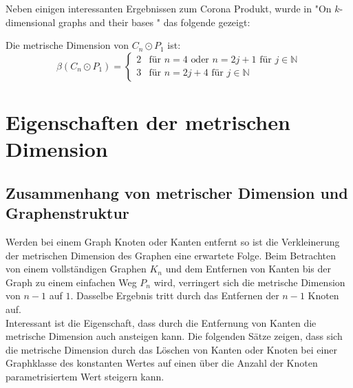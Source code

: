 Neben einigen interessanten Ergebnissen zum Corona Produkt, wurde in  "On $k$-dimensional graphs and their bases
"\cite{bases} das folgende gezeigt:
\begin{lem}Die metrische Dimension von $C_n \odot P_1$ ist:
\begin{equation}
  \beta(C_n \odot P_1)=
   \begin{cases}
     2 & \text{f\"ur } n = 4 \text{ oder } n = 2j+1 \text{ f\"ur } j \in \mathbb{N} \\
     3 & \text{f\"ur } n = 2j+4 \text{ f\"ur } j \in \mathbb{N} 
   \end{cases}
\end{equation}
\end{lem}
\chapter{Eigenschaften der metrischen Dimension}
\label{kapallg}
\section{Zusammenhang von metrischer Dimension und Graphenstruktur}
Werden bei einem Graph Knoten oder Kanten entfernt so ist die Verkleinerung der metrischen Dimension des Graphen eine erwartete Folge. Beim Betrachten von einem vollständigen Graphen $K_n$ und dem Entfernen von Kanten bis der Graph zu einem einfachen Weg $P_n$ wird, verringert sich die metrische Dimension von $n-1$ auf $1$. Dasselbe Ergebnis tritt durch das Entfernen der $n-1$ Knoten auf.\\Interessant ist die Eigenschaft, dass durch die Entfernung von Kanten die metrische Dimension auch ansteigen kann. Die folgenden Sätze zeigen, dass sich die metrische Dimension durch das Löschen von Kanten oder Knoten bei einer Graphklasse des konstanten Wertes auf einen über die Anzahl der Knoten parametrisiertem Wert steigern kann.
